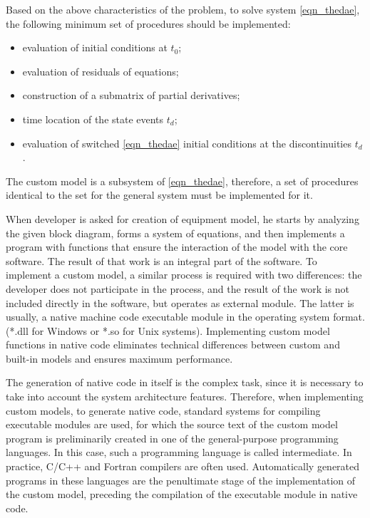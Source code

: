 \documentclass[lettersize,journal]{IEEEtran}
\begin{document}
Based on the above characteristics of the problem, to solve system \eqref{eqn_thedae}, the following minimum set of procedures should be implemented:
\begin{itemize}
	\item evaluation of initial conditions at \(t_0\);
	\item evaluation of residuals of equations;
	\item construction of a submatrix of partial derivatives;
	\item time location of the state events \(t_d\);
	\item evaluation of switched \eqref{eqn_thedae} initial conditions at the discontinuities \(t_d\).
\end{itemize}

The custom model is a subsystem of \eqref{eqn_thedae}, therefore, a set of procedures identical to the set for the general system must be implemented for it.

When developer is asked for creation of equipment model, he starts by analyzing the given block diagram, forms a system of equations, and then implements 
a program with functions that ensure the interaction of the model with the core software. The result of that work is an integral part of the software. 
To implement a custom model, a similar process is required with two differences: the developer does not participate in the process, and the result of the work 
is not included directly in the software, but operates as external module. The latter is usually, a native machine code executable module in the operating system format.
(*.dll for Windows or *.so for Unix systems). Implementing custom model functions in native code eliminates technical differences between custom and 
built-in models and ensures maximum performance.

The generation of native code in itself is the complex task, since it is necessary to take into account the system architecture features.
Therefore, when implementing custom models, to generate native code, standard systems for compiling executable modules are used, 
for which the source text of the custom model program is preliminarily created in one of the general-purpose programming languages. 
In this case, such a programming language is called intermediate. In practice, C/C++ and Fortran compilers are often used. 
Automatically generated programs in these languages are the penultimate stage of the implementation of the custom model, 
preceding the compilation of the executable module in native code.
\end{document}
